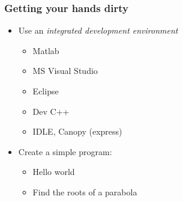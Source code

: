 \documentclass[11pt,table,final,fleqn,xcolor={usenames,dvipsnames},unknownkeysallowed]{beamer}
\begin{document}
\begin{frame}
 \frametitle{Getting your hands dirty}
 \begin{itemize}
   \item Use an \emph{integrated development environment}
   \begin{itemize}
     \item Matlab
     \item MS Visual Studio
     \item Eclipse
     \item Dev C++
     \item IDLE, Canopy (express)
   \end{itemize}
   \item Create a simple program:
   \begin{itemize}
     \item Hello world
     \item Find the roots of a parabola
   \end{itemize}
 \end{itemize}
\end{frame}

% 
\end{document}
